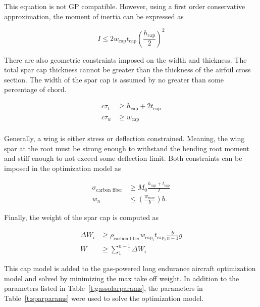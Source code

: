 \documentclass[]{aiaa-tc}%
\begin{document}
This equation is not GP compatible.  However, using a first order conservative approximation, the moment of inertia can be expressed as

\begin{equation}
    \label{e:moispar}
    I \leq 2w_{\text{cap}}t_{\text{cap}}\left(\frac{h_{\text{cap}}}{2}\right)^2
\end{equation}

There are also geometric constraints imposed on the width and thickness.  The total spar cap thickness cannot be greater than the thickness of the airfoil cross section.  The width of the spar cap is assumed by no greater than some percentage of chord.

\begin{align}
    \label{e:thickness}
    c\tau_t &\geq h_{\text{cap}} + 2t_{\text{cap}} \\
    \label{e:width}
    c\tau_w &\geq w_{\text{cap}} \\
    \end{align}

Generally, a wing is either stress or deflection constrained. Meaning, the wing spar at the root must be strong enough to withstand the bending root moment and stiff enough to not exceed some deflection limit.  Both constraints can be imposed in the optimization model as

\begin{align}
    \label{e:stresscont}
    \sigma_{\text{carbon fiber}} &\geq M_0 \frac{h_{\text{cap}}+t_{\text{cap}}}{I}\\
    \label{e:defcont}
    w_n &\leq \left(\frac{w_{max}}{b} \right) b.
\end{align}

Finally, the weight of the spar cap is computed as

\begin{align}
    \label{e:sparmass}
    \Delta W_i &\geq \rho_{\text{carbon fiber}} w_{\text{cap}_i}t_{\text{cap}_i} \frac{b}{n-1}g \\
    \label{e:sparmasssum}
    W &\geq \sum\limits_{1}^{n-1} \Delta W_i
\end{align}

This cap model is added to the gas-powered long endurance aircraft optimization model and solved by minimizing the max take off weight.  In addition to the parameters listed in Table~\ref{t:gassolarparams}, the parameters in Table~\ref{t:sparparams} were used to solve the optimization model.  \\
\end{document}
